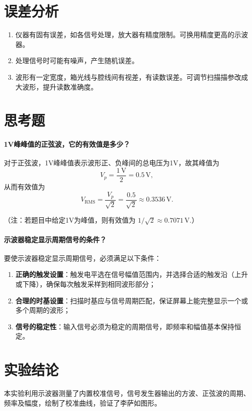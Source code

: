 \documentclass[12pt,a4paper]{article}
\begin{document}
	
	\section{误差分析}
	\begin{enumerate}
		\item 仪器有固有误差，如各信号处理，放大器有精度限制。可换用精度更高的示波器。
		\item 处理信号时可能有噪声，产生随机误差。
		\item 波形有一定宽度，箱光线与腔线间有视差，有读数误差。可调节扫描描参改成大波形，提升读数准确度。
	\end{enumerate}

	\section{思考题}
	\paragraph{1V峰峰值的正弦波，它的有效值是多少？\\}
	对于正弦波，1V峰峰值表示波形正、负峰间的总电压为1V，故其峰值为 
	\[
	V_p = \frac{1\,\mathrm{V}}{2} = 0.5\,\mathrm{V},
	\]
	从而有效值为
	\[
	V_{\mathrm{RMS}} = \frac{V_p}{\sqrt{2}} = \frac{0.5}{\sqrt{2}} \approx 0.3536\,\mathrm{V}.
	\]
	
	（注：若题目中给定1V为峰值，则有效值为 \(1/\sqrt{2}\approx 0.7071\,\mathrm{V}\).）
	
	\paragraph{示波器稳定显示周期信号的条件？\\}
	要使示波器稳定显示周期信号，必须满足以下条件：
	\begin{enumerate}
		\item \textbf{正确的触发设置}：触发电平选在信号幅值范围内，并选择合适的触发沿（上升或下降），确保每次触发采样到相同波形部分；
		\item \textbf{合理的时基设置}：扫描时基应与信号周期匹配，保证屏幕上能完整显示一个或多个周期的波形；
		\item \textbf{信号的稳定性}：输入信号必须为稳定的周期信号，即频率和幅值基本保持恒定。
	\end{enumerate}
	
	
	\section{实验结论}
	本实验利用示波器测量了内置校准信号，信号发生器输出的方波、正弦波的周期、频率及幅度，绘制了校准曲线，验证了李萨如图形。
\end{document}
